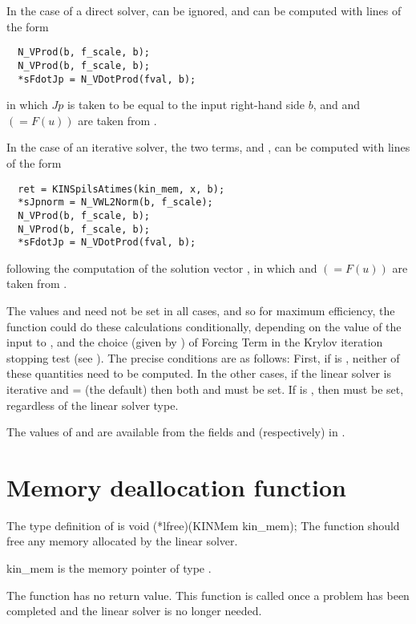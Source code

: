 In the case of a direct solver,  can be ignored, and
 can be computed with lines of the form
\vspace{-.1in}
  \begin{verbatim}
  N_VProd(b, f_scale, b);
  N_VProd(b, f_scale, b);
  *sFdotJp = N_VDotProd(fval, b);
  \end{verbatim}
\vspace{-.2in}
in which $Jp$ is taken to be equal to the input right-hand side $b$,
and  and  $(= F(u))$ are taken from .

In the case of an iterative solver, the two terms,  and
, can be computed with lines of the form
\vspace{-.1in}
  \begin{verbatim}
  ret = KINSpilsAtimes(kin_mem, x, b);
  *sJpnorm = N_VWL2Norm(b, f_scale);
  N_VProd(b, f_scale, b);
  N_VProd(b, f_scale, b);
  *sFdotJp = N_VDotProd(fval, b);
  \end{verbatim}
\vspace{-.2in}
following the computation of the solution vector , in which
 and  $(= F(u))$ are taken from .

The values  and  need not be set in all cases,
and so for maximum efficiency, the  function could do these
calculations conditionally, depending on the value of the input 
to , and the choice (given by ) of Forcing Term
in the Krylov iteration stopping test (see ).
The precise conditions are as follows:  First, if  is
, neither of these quantities need to be computed.
In the other cases, if the linear solver is iterative
and  =  (the default) then both
 and  must be set.  If  is
, then  must be set, regardless of
the linear solver type.

The values of  and  are available from the fields
 and  (respectively) in .


\section{Memory deallocation function}
The type definition of  is
{
  void (*lfree)(KINMem kin\_mem);
}
{
  The  function should free any memory allocated by the linear solver.
}
{
  \begin{args}
  \item[kin\_mem]
    is the {\kinsol} memory pointer of type .
  \end{args}
}
{
  The  function has no return value.
}
{
  This function is called once a problem has been completed and the 
  linear solver is no longer needed.
}

